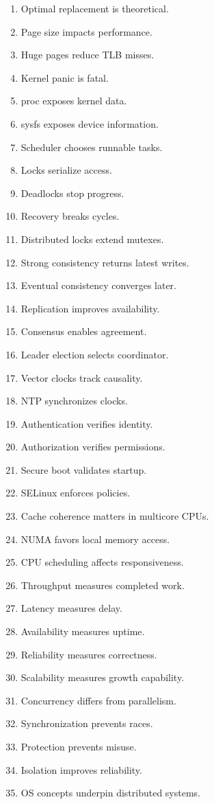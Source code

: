 \begin{enumerate}
\item Optimal replacement is theoretical.
\item Page size impacts performance.
\item Huge pages reduce TLB misses.
\item Kernel panic is fatal.
\item proc exposes kernel data.
\item sysfs exposes device information.
\item Scheduler chooses runnable tasks.
\item Locks serialize access.
\item Deadlocks stop progress.
\item Recovery breaks cycles.
\item Distributed locks extend mutexes.
\item Strong consistency returns latest writes.
\item Eventual consistency converges later.
\item Replication improves availability.
\item Consensus enables agreement.
\item Leader election selects coordinator.
\item Vector clocks track causality.
\item NTP synchronizes clocks.
\item Authentication verifies identity.
\item Authorization verifies permissions.
\item Secure boot validates startup.
\item SELinux enforces policies.
\item Cache coherence matters in multicore CPUs.
\item NUMA favors local memory access.
\item CPU scheduling affects responsiveness.
\item Throughput measures completed work.
\item Latency measures delay.
\item Availability measures uptime.
\item Reliability measures correctness.
\item Scalability measures growth capability.
\item Concurrency differs from parallelism.
\item Synchronization prevents races.
\item Protection prevents misuse.
\item Isolation improves reliability.
\item OS concepts underpin distributed systems.
\end{enumerate}

